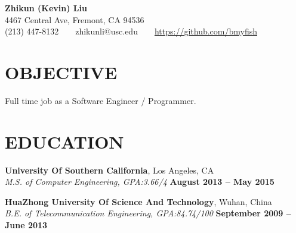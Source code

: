 \documentclass[margin,line]{resume}
\begin{document}
\begin{center}
    \textbf{\large Zhikun (Kevin) Liu}\\
    4467 Central Ave, Fremont, CA 94536\\
    (213) 447-8132\ \ \textbullet \ \ zhikunli@usc.edu\ \ \textbullet \ \ 
    \href{https://github.com/bmyfish}{https://github.com/bmyfish}
\end{center}
\vspace{-3mm}

\begin{resume}

\vspace{-3mm}
	\section{\mysidestyle \textbf{\large{O}\small{BJECTIVE}}}
	Full time job as a Software Engineer / Programmer.

	\sectionline

    \section{\mysidestyle \textbf{\large{E}\small{DUCATION}}}
    \textbf{\listing University Of Southern California}, Los Angeles, CA \vspace{2mm}\\\vspace{1mm}%
    \textsl{M.S. of Computer Engineering, GPA:3.66/4} \hfill \textbf{August 2013 -- May 2015}\vspace{-3mm}\\\vspace{-3mm}%

    \textbf{\listing HuaZhong University Of Science And Technology}, Wuhan, China \vspace{2mm}\\\vspace{1mm}%
    \textsl{B.E. of Telecommunication Engineering, GPA:84.74/100} \hfill \textbf{September 2009 -- June 2013}\vspace{-3mm}\\\vspace{-1mm}%


\sectionline


\end{resume}
\end{document}
